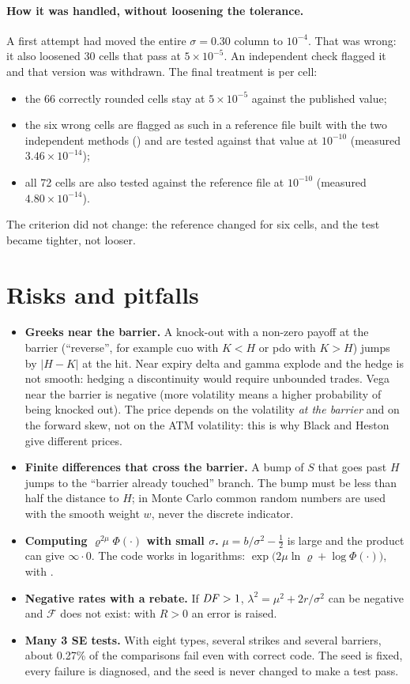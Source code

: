 \paragraph{How it was handled, without loosening the tolerance.} A first attempt had moved the entire $\sigma=0.30$
column to $10^{-4}$. That was wrong: it also loosened 30 cells that pass at $5\times10^{-5}$. An independent check
flagged it and that version was withdrawn. The final treatment is per cell:
\begin{itemize}
\item the 66 correctly rounded cells stay at $5\times10^{-5}$ against the published value;
\item the six wrong cells are flagged as such in a reference file built with the two independent methods
() and are tested against that value at $10^{-10}$ (measured
$3.46\times10^{-14}$);
\item all 72 cells are also tested against the reference file at $10^{-10}$ (measured $4.80\times10^{-14}$).
\end{itemize}
The criterion did not change: the reference changed for six cells, and the test became tighter, not looser.

\section{Risks and pitfalls}
\begin{itemize}
\item \textbf{Greeks near the barrier.} A knock-out with a non-zero payoff at the barrier (``reverse'', for example
cuo with $K<H$ or pdo with $K>H$) jumps by $|H-K|$ at the hit. Near expiry delta and gamma explode and the hedge is
not smooth: hedging a discontinuity would require unbounded trades. Vega near the barrier is negative (more volatility
means a higher probability of being knocked out). The price depends on the volatility \emph{at the barrier} and on the
forward skew, not on the ATM volatility: this is why Black and Heston give different prices.
\item \textbf{Finite differences that cross the barrier.} A bump of $S$ that goes past $H$ jumps to the ``barrier
already touched'' branch. The bump must be less than half the distance to $H$; in Monte Carlo common random numbers
are used with the smooth weight $w$, never the discrete indicator.
\item \textbf{Computing $\varrho^{2\mu}\Phi(\cdot)$ with small $\sigma$.} $\mu=b/\sigma^2-\frac12$ is large and the
product can give $\infty\cdot0$. The code works in logarithms:
$\exp\big(2\mu\ln\varrho+\log\Phi(\cdot)\big)$, with .
\item \textbf{Negative rates with a rebate.} If $\mathit{DF}>1$, $\lambda^2=\mu^2+2r/\sigma^2$ can be negative and
$\mathcal F$ does not exist: with $R>0$ an error is raised.
\item \textbf{Many 3 SE tests.} With eight types, several strikes and several barriers, about 0.27\% of the
comparisons fail even with correct code. The seed is fixed, every failure is diagnosed, and the seed is never changed
to make a test pass.
\end{itemize}

